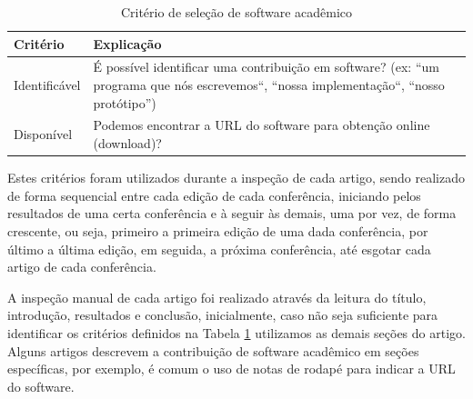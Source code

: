 
\begin{table}[h]
\caption{Critério de seleção de software acadêmico}
\centering
\begin{tabular}{ l p{12cm} }
  \hline
  Critério         & Explicação \\
  \hline
  Identificável    & É possível identificar uma contribuição em software? (ex: ``um programa que nós escrevemos``, ``nossa implementação``, ``nosso protótipo'') \\
  Disponível       & Podemos encontrar a URL do software para obtenção online (download)? \\
  \hline
\end{tabular}
\label{criterios-selecao}
\end{table}

Estes critérios foram utilizados durante a inspeção de cada artigo, sendo
realizado de forma sequencial entre cada edição de cada conferência, iniciando
pelos resultados de uma certa conferência e à seguir às demais, uma por vez, de
forma crescente, ou seja, primeiro a primeira edição de uma dada conferência,
por último a última edição, em seguida, a próxima conferência, até esgotar cada
artigo de cada conferência.


A inspeção manual de cada artigo foi realizado através da leitura do título,
introdução, resultados e conclusão, inicialmente, caso não seja suficiente para
identificar os critérios definidos na Tabela \ref{criterios-selecao} utilizamos
as demais seções do artigo. Alguns artigos descrevem a contribuição de software
acadêmico em seções específicas, por exemplo, é comum o uso de notas de rodapé
para indicar a URL do software.


